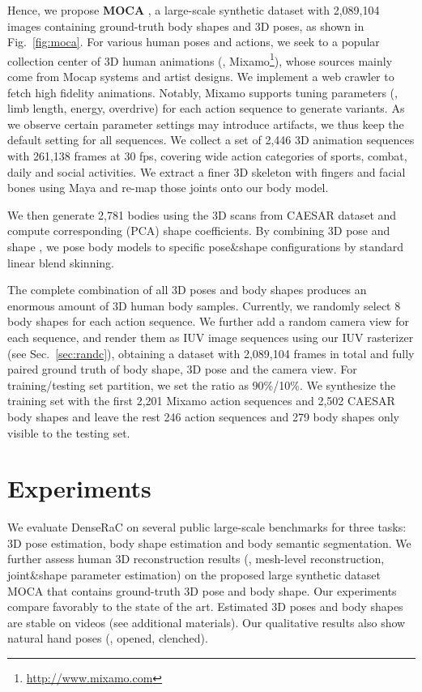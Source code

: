\documentclass[10pt,twocolumn,letterpaper]{article}
\newcommand{\beforesection}{\vspace{0mm}}
\newcommand{\aftersection}{\vspace{0mm}}
\begin{document}
Hence, we propose \textbf{MOCA}
, a large-scale synthetic dataset with 2,089,104 images containing ground-truth body shapes and 3D poses, as shown in Fig.~\ref{fig:moca}. For various human poses and actions, we seek to a popular collection center of 3D human animations (\ie, Mixamo\footnote{\url{http://www.mixamo.com}}), whose sources mainly come from Mocap systems and artist designs. We implement a web crawler to fetch high fidelity animations. Notably, Mixamo supports tuning parameters (\eg, limb length, energy, overdrive) for each action sequence to generate variants. As we observe certain parameter settings may introduce artifacts, we thus keep the default setting for all sequences. We collect a set of 2,446 3D animation sequences with 261,138 frames at 30 fps, covering wide action categories of sports, combat, daily and social activities. We extract a finer 3D skeleton with fingers and facial bones using Maya and re-map those joints onto our body model.

We then generate 2,781 bodies using the 3D scans from CAESAR dataset and compute corresponding (PCA) shape coefficients. By combining 3D pose  and shape , we pose body models to specific pose\&shape configurations by standard linear blend skinning.

The complete combination of all 3D poses and body shapes produces an enormous amount of 3D human body samples. Currently, we randomly select 8 body shapes for each action sequence.
We further add a random camera view for each sequence, and render them as IUV image sequences using our IUV rasterizer (see Sec.~\ref{sec:randc}), obtaining a dataset with 2,089,104 frames in total and fully paired ground truth of body shape, 3D pose and the camera view.
For training/testing set partition, we set the ratio as 90\%/10\%. We synthesize the training set with the first 2,201 Mixamo action sequences and 2,502 CAESAR body shapes and leave the rest 246 action sequences and 279 body shapes only visible to the testing set.

\beforesection
\section{Experiments} \label{sec:experiments}
\aftersection

We evaluate DenseRaC on several public large-scale benchmarks for three tasks: 3D pose estimation, body shape estimation and body semantic segmentation.
We further assess human 3D reconstruction results (\ie, mesh-level reconstruction, joint\&shape parameter estimation) on the proposed large synthetic dataset MOCA that contains ground-truth 3D pose and body shape.
Our experiments compare favorably to the state of the art.
Estimated 3D poses and body shapes are stable on videos (see additional materials).
Our qualitative results also show natural hand poses (\eg, opened, clenched).
\end{document}
